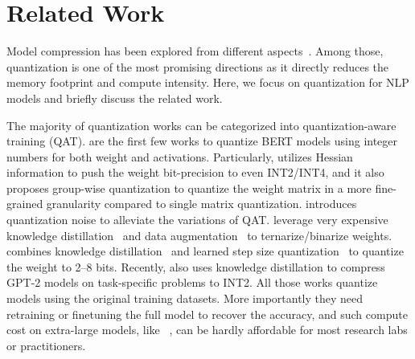 \section{Related Work}
\label{sec:related_work}

Model compression has been explored from different aspects~\cite{han2015learning, li2016pruning,mao2017exploring,lecun1990optimal,michel2019sixteen, fan2019reducing, gordon2020compressing, raganato2020fixed,dong2019hawq,yao2021mlpruning, mao2020ladabert,hinton2015distilling,sanh2019distilbert, sun2019patient,jiao2019tinybert, sun2020mobilebert, wang2020minilm, lan2019albert, dehghani2018universal,liu2021post,kim2021bert}. Among those, quantization is one of the most promising directions as it directly reduces the memory footprint and compute intensity. Here, we focus on quantization for NLP models and briefly discuss the related work.

The majority of quantization works can be categorized into quantization-aware training (QAT). \cite{shen2020q,zafrir2019q8bert} are the first few works to quantize BERT models using integer numbers for both weight and activations. Particularly, \cite{shen2020q} utilizes Hessian information to push the weight bit-precision to even INT2/INT4, and it also proposes group-wise quantization to quantize the weight matrix in a more fine-grained granularity compared to single matrix quantization. \cite{fan2020training} introduces quantization noise to alleviate the variations of QAT. \cite{zhang2020ternarybert,bai2020binarybert} leverage very expensive knowledge distillation~\cite{hinton2015distilling} and data augmentation~\cite{jiao2019tinybert} to ternarize/binarize weights. \cite{jin2021kdlsq} combines knowledge distillation~\cite{jiao2019tinybert} and learned step size quantization~\cite{esser2019learned} to quantize the weight to 2--8 bits. Recently, \cite{tao2022compression} also uses knowledge distillation to compress GPT-2 models on task-specific problems to INT2. All those works quantize models using the original training datasets. More importantly they need retraining or finetuning the full model to recover the accuracy, and such compute cost on extra-large models, like ~\cite{smith2022using,chowdhery2022palm}, can be hardly affordable for most research labs or practitioners. 

